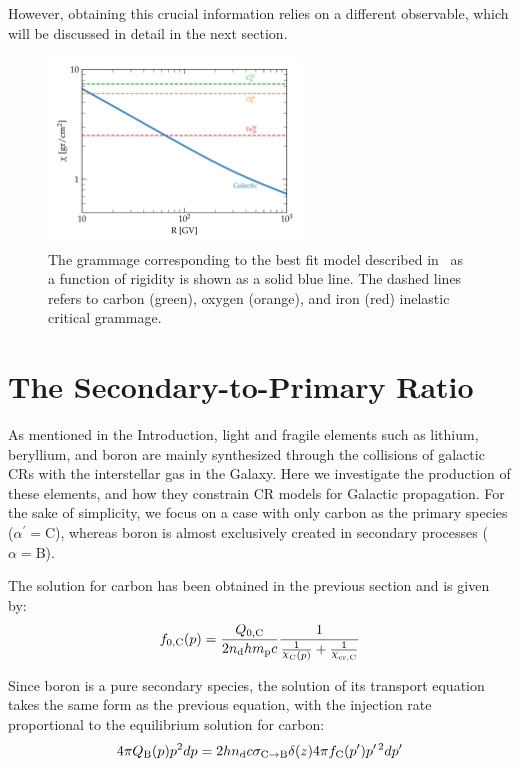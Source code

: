 However, obtaining this crucial information relies on a different observable, which will be discussed in detail in the next section.

\begin{figure}[t]
\centering
\includegraphics[width=0.6\textwidth]{figures/grammage_critical.pdf}
\caption{The grammage corresponding to the best fit model described in~\cite{Schroer2021prd} as a function of rigidity is shown as a solid blue line. The dashed lines refers to carbon (green), oxygen (orange), and iron (red) inelastic critical grammage.}
\label{fig:grammage}
\end{figure}

\section{The Secondary-to-Primary Ratio}
\label{sec:secondaryoverprimary}

As mentioned in the Introduction, light and fragile elements such as lithium, beryllium, and boron are mainly synthesized through the collisions of galactic CRs with the interstellar gas in the Galaxy. Here we investigate the production of these elements, and how they constrain CR models for Galactic propagation. 
%
For the sake of simplicity, we focus on a case with only carbon as the primary species ($\alpha^\prime = \text{C}$), whereas boron is almost exclusively created in secondary processes ($\alpha = \text{B}$).

The solution for carbon has been obtained in the previous section and is given by:
%
\begin{equation}
f_{0,\rm C}(p) = \frac{Q_{0,\rm C}}{2n_{\rm d}h m_{\rm p}c} \frac{1}{\frac{1}{\rchi_{\rm C}(p)} + \frac{1}{\rchi_{\rm cr, C}}}
\end{equation}

Since boron is a pure secondary species, the solution of its transport equation takes the same form as the previous equation, with the injection rate proportional to the equilibrium solution for carbon:
%
\begin{equation}
4 \pi Q_{\rm B}(p) p^2 dp = 2 h n_{\rm d} c \sigma_{\rm C \rightarrow B} \delta(z) 4 \pi f_{\rm C}(p^\prime) p^{\prime \, 2} dp^\prime
\end{equation}

